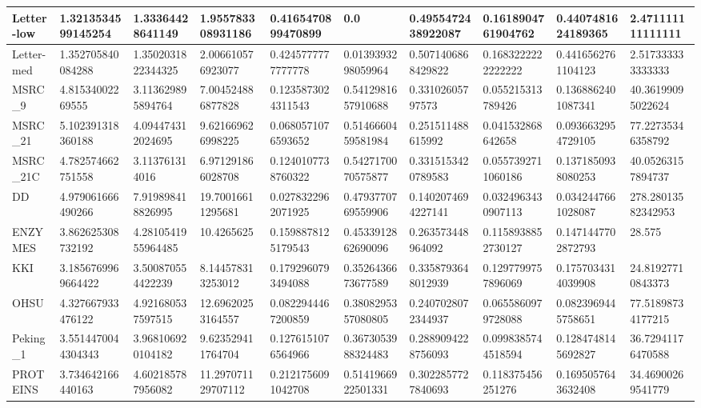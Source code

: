 \documentclass{article}
\begin{document}
\begin{table}[!ht]
\begin{tabular}{|l|l|l|l|l|l|l|l|l|l|}
        Letter-low & 1.3213534599145254 & 1.33364428641149 & 1.955783308931186 & 0.4165470899470899 & 0.0 & 0.4955472438922087 & 0.1618904761904762 & 0.4407481624189365 & 2.471111111111111 \\ \hline
        Letter-med & 1.352705840084288 & 1.3502031822344325 & 2.006610576923077 & 0.4245777777777778 & 0.0139393298059964 & 0.5071406868429822 & 0.1683222222222222 & 0.4416562761104123 & 2.517333333333333 \\ \hline
        MSRC\_9 & 4.81534002269555 & 3.113629895894764 & 7.004524886877828 & 0.1235873024311543 & 0.5412981657910688 & 0.33102605797573 & 0.055215313789426 & 0.1368862401087341 & 40.36199095022624 \\ \hline
        MSRC\_21 & 5.102391318360188 & 4.094474312024695 & 9.621669626998225 & 0.0680571076593652 & 0.5146660459581984 & 0.251511488615992 & 0.041532868642658 & 0.0936632954729105 & 77.22735346358792 \\ \hline
        MSRC\_21C & 4.782574662751558 & 3.113761314016 & 6.971291866028708 & 0.1240107738760322 & 0.5427170070575877 & 0.3315153420789583 & 0.0557392711060186 & 0.1371850938080253 & 40.05263157894737 \\ \hline
        DD & 4.979061666490266 & 7.919898418826995 & 19.70016611295681 & 0.0278322962071925 & 0.4793770769559906 & 0.1402074694227141 & 0.0324963430907113 & 0.0342447661028087 & 278.28013582342953 \\ \hline
        ENZYMES & 3.862625308732192 & 4.2810541955964485 & 10.4265625 & 0.1598878125179543 & 0.4533912862690096 & 0.263573448964092 & 0.1158938852730127 & 0.1471447702872793 & 28.575 \\ \hline
        KKI & 3.1856769969664422 & 3.500870554422239 & 8.144578313253012 & 0.1792960793494088 & 0.3526436673677589 & 0.3358793648012939 & 0.1297799757896069 & 0.1757034314039908 & 24.81927710843373 \\ \hline
        OHSU & 4.327667933476122 & 4.921680537597515 & 12.69620253164557 & 0.0822944467200859 & 0.3808295357080805 & 0.2407028072344937 & 0.0655860979728088 & 0.0823969445758651 & 77.51898734177215 \\ \hline
        Peking\_1 & 3.5514470044304343 & 3.968106920104182 & 9.623529411764704 & 0.1276151076564966 & 0.3673053988324483 & 0.2889094228756093 & 0.0998385744518594 & 0.1284748145692827 & 36.72941176470588 \\ \hline
        PROTEINS & 3.734642166440163 & 4.602185787956082 & 11.297071129707112 & 0.2121756091042708 & 0.5141966922501331 & 0.3022857727840693 & 0.118375456251276 & 0.1695057643632408 & 34.46900269541779 \\ \hline

\end{tabular}
\end{table}
\end{document}
